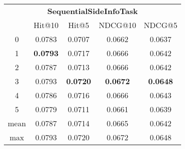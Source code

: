 \documentclass{article}
\begin{document}
 

\begin{tabular}{c|cccc}

\multicolumn{5}{c}{\textbf{SequentialSideInfoTask}} \\
\noalign{\smallskip}
\noalign{\smallskip}
\toprule
\multicolumn{1}{c}{Template ID}	&	\multicolumn{1}{|c}{Hit@10}	&	\multicolumn{1}{c}{Hit@5}	&	\multicolumn{1}{c}{NDCG@10}	&	\multicolumn{1}{c}{NDCG@5}\\
\midrule
0	&	0.0783	&	0.0707	&	0.0662	&	0.0637\\
1	&	\textbf{0.0793}	&	0.0717	&	0.0666	&	0.0642\\
2	&	0.0787	&	0.0713	&	0.0666	&	0.0642\\
3	&	0.0793	&	\textbf{0.0720}	&	\textbf{0.0672}	&	\textbf{0.0648}\\
4	&	0.0786	&	0.0716	&	0.0666	&	0.0643\\
5	&	0.0779	&	0.0711	&	0.0661	&	0.0639\\
\midrule
mean	&	0.0787	&	0.0714	&	0.0665	&	0.0642\\
max	&	0.0793	&	0.0720	&	0.0672	&	0.0648\\
\bottomrule

\end{tabular}
\end{document}
